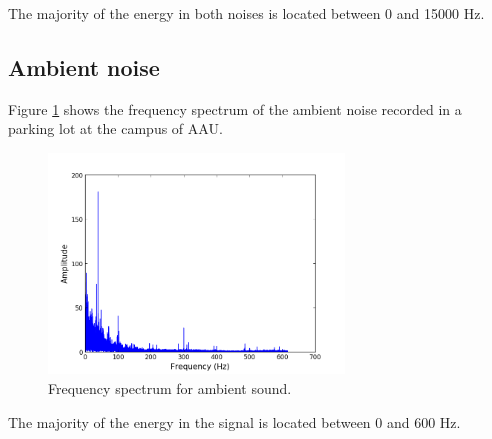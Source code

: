 The majority of the energy in both noises is located between 0 and 15000 Hz.
\subsection{Ambient noise}
Figure \ref{fig:ambient} shows the frequency spectrum of the ambient noise recorded in a parking lot at the campus of AAU.
\begin{figure}[H]
\centering
\includegraphics[width=0.7\textwidth]{figures/freqanal/ambient.png}
\caption{Frequency spectrum for ambient sound.}
\label{fig:ambient}
\end{figure}
The majority of the energy in the signal is located between 0 and 600 Hz.











